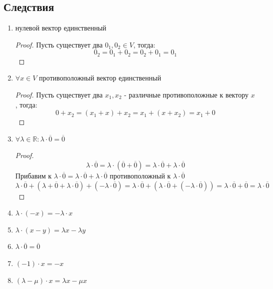 \documentclass[a4paper, 12pt]{article}
\newcommand{\R}{\mathbb R}
\theoremstyle{definition}
\begin{document}
  \subsection{Следствия}
  \begin{enumerate}
    \item нулевой вектор единственный
    \begin{proof}
      Пусть существует два $0_1,0_2 \in V$, тогда: $$0_2 = 0_1 + 0_2 = 0_2 + 0_1 = 0_1$$   
    \end{proof} 
    \item $\forall x \in V$ противоположный вектор единственный
    \begin{proof}
      Пусть существует два $x_1,x_2$ - различные противоположные к вектору $x$, тогда:
      $$0 + x_2 = (x_1 + x) + x_2 = x_1 + (x + x_2) = x_1 + 0$$    
    \end{proof} 
    \item $\forall \lambda \in \R: \lambda \cdot \overline{0} = \overline{0}$ 
      \begin{proof}
      $$\lambda \cdot \overline{0} = \lambda \cdot (\overline{0}+\overline{0}) = \lambda \cdot \overline{0} + \lambda \cdot \overline{0}$$ Прибавим к $\lambda \cdot \overline{0} = \lambda \cdot \overline{0} + \lambda \cdot \overline{0}$  противоположный к $\lambda \cdot \overline{0}$ $$\lambda \cdot \overline{0} + (\lambda + \overline{0}+\lambda \cdot \overline{0}) + (-\lambda \cdot \overline{0}) = \lambda \cdot \overline{0} + (\lambda \cdot \overline{0} + (-\lambda \cdot \overline{0})) = \lambda \cdot \overline{0} + \overline{0} = \lambda \cdot \overline{0}$$ 
      \end{proof} 
    \item $\lambda \cdot (-x) = -\lambda \cdot x$
    \item $\lambda \cdot (x-y) = \lambda x - \lambda y$ 
    \item $\lambda \cdot \overline{0} = \overline{0}$
    \item $(-1) \cdot x = -x$
    \item $(\lambda - \mu)\cdot x = \lambda x - \mu x$  
  \end{enumerate}
\end{document}
